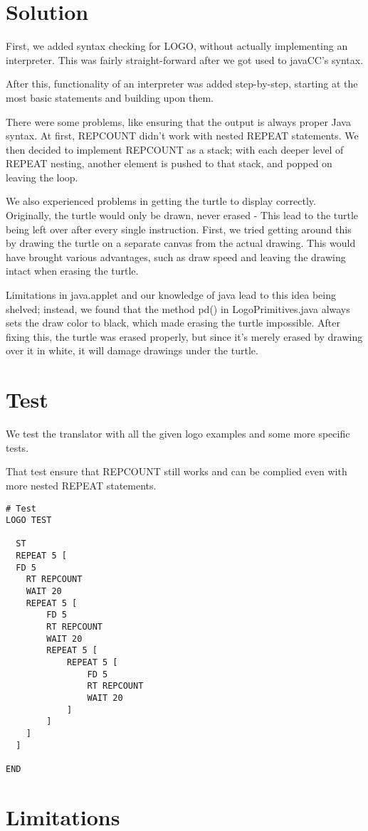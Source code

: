 \documentclass[a4paper, 12pt, parskip=full*]{scrreprt}
\begin{document}
\chapter{Solution}

First, we added syntax checking for LOGO, without actually implementing an interpreter. This was fairly straight-forward after we got used to javaCC's syntax.

After this, functionality of an interpreter was added step-by-step, starting at the most basic statements and building upon them.

There were some problems, like ensuring that the output is always proper Java syntax.
At first, REPCOUNT didn't work with nested REPEAT statements. We then decided to implement REPCOUNT as a stack; with each deeper level of REPEAT nesting, another element is pushed to that stack, and popped on leaving the loop.

We also experienced problems in getting the turtle to display correctly. Originally, the turtle would only be drawn, never erased - This lead to the turtle being left over after every single instruction.
First, we tried getting around this by drawing the turtle on a separate canvas from the actual drawing. This would have brought various advantages, such as draw speed and leaving the drawing intact when erasing the turtle.

Limitations in java.applet and our knowledge of java lead to this idea being shelved; instead, we found that the method pd() in LogoPrimitives.java always sets the draw color to black, which made erasing the turtle impossible.
After fixing this, the turtle was erased properly, but since it's merely erased by drawing over it in white, it will damage drawings under the turtle.

\chapter{Test}
We test the translator with all the given logo examples and some more specific tests.

That test ensure that REPCOUNT still works and can be complied even with more nested REPEAT statements.

\begin{lstlisting}[frame=single]
# Test 
LOGO TEST

  ST
  REPEAT 5 [
  FD 5
    RT REPCOUNT
    WAIT 20
	REPEAT 5 [
		FD 5
		RT REPCOUNT
		WAIT 20
		REPEAT 5 [
			REPEAT 5 [
				FD 5
				RT REPCOUNT 
				WAIT 20
			]
		]
	]
  ]

END
\end{lstlisting}

\chapter{Limitations}
\end{document}

